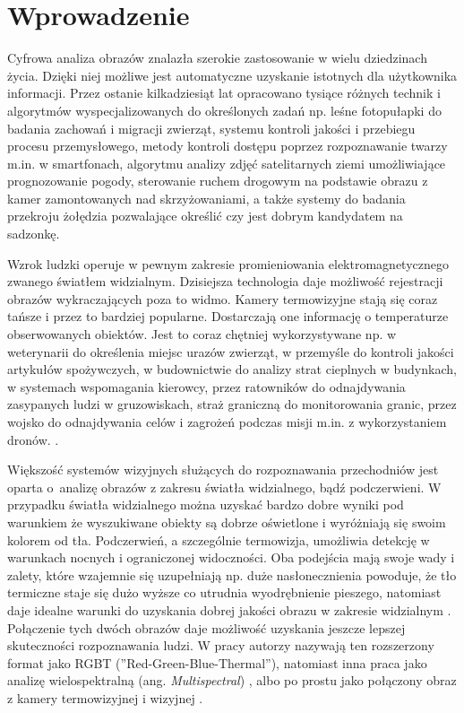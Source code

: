 \chapter{Wprowadzenie}

Cyfrowa analiza obrazów znalazła szerokie zastosowanie w wielu dziedzinach życia. 
Dzięki niej możliwe jest automatyczne uzyskanie istotnych dla użytkownika informacji. 
Przez ostanie kilkadziesiąt lat opracowano tysiące różnych technik i algorytmów wyspecjalizowanych do określonych zadań np. leśne fotopułapki do badania zachowań i migracji zwierząt, systemu kontroli jakości i przebiegu procesu przemysłowego, metody kontroli dostępu poprzez rozpoznawanie twarzy m.in. w smartfonach, algorytmu analizy zdjęć satelitarnych ziemi umożliwiające prognozowanie pogody, sterowanie ruchem drogowym na podstawie obrazu z kamer zamontowanych nad skrzyżowaniami, a także systemy do badania przekroju żołędzia pozwalające określić czy jest dobrym kandydatem na sadzonkę.


Wzrok ludzki operuje w pewnym zakresie promieniowania elektromagnetycznego zwanego światłem widzialnym. 
Dzisiejsza technologia daje możliwość rejestracji obrazów wykraczających poza to widmo. 
Kamery termowizyjne stają się coraz tańsze i przez to bardziej popularne. 
Dostarczają one informację o temperaturze obserwowanych obiektów. 
Jest to coraz chętniej wykorzystywane np. w weterynarii do określenia miejsc urazów zwierząt, w przemyśle do kontroli jakości artykułów spożywczych, w budownictwie do analizy strat cieplnych w budynkach, w systemach wspomagania kierowcy, przez ratowników do odnajdywania zasypanych ludzi w gruzowiskach, straż graniczną do monitorowania granic, przez wojsko do odnajdywania celów i zagrożeń podczas misji m.in. z wykorzystaniem dronów. \cite{gade2014thermal}. 

Większość systemów wizyjnych służących do rozpoznawania przechodniów jest oparta o~analizę obrazów z zakresu światła widzialnego, bądź podczerwieni. 
W przypadku światła widzialnego można uzyskać bardzo dobre wyniki pod warunkiem że wyszukiwane obiekty są dobrze oświetlone i wyróżniają się swoim kolorem od tła. 
Podczerwień, a szczególnie termowizja, umożliwia detekcję w warunkach nocnych i ograniczonej widoczności.
Oba podejścia mają swoje wady i zalety, które wzajemnie się uzupełniają np. duże nasłonecznienia powoduje, że tło termiczne staje się dużo wyższe co utrudnia wyodrębnienie pieszego, natomiast daje idealne warunki do uzyskania dobrej jakości obrazu w zakresie widzialnym \cite{lee2015robust}. 
Połączenie tych dwóch obrazów daje możliwość uzyskania jeszcze lepszej skuteczności rozpoznawania ludzi. 
W pracy \cite{st2007combination} autorzy nazywają ten rozszerzony format jako RGBT (''Red-Green-Blue-Thermal''), natomiast inna praca jako analizę wielospektralną (ang. \textit{Multispectral}) \cite{hwang2015multispectral}, albo po prostu jako połączony obraz z kamery termowizyjnej i wizyjnej \cite{lee2015robust}. 

